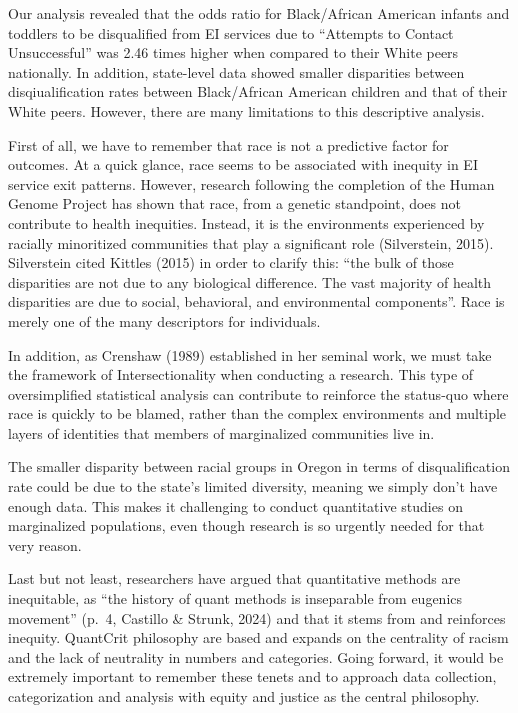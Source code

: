 \documentclass[
  letterpaper,
  DIV=11,
  numbers=noendperiod]{scrartcl}
\begin{document}
Our analysis revealed that the odds ratio for Black/African American
infants and toddlers to be disqualified from EI services due to
``Attempts to Contact Unsuccessful'' was 2.46 times higher when compared
to their White peers nationally. In addition, state-level data showed
smaller disparities between disqiualification rates between
Black/African American children and that of their White peers. However,
there are many limitations to this descriptive analysis.

First of all, we have to remember that race is not a predictive factor
for outcomes. At a quick glance, race seems to be associated with
inequity in EI service exit patterns. However, research following the
completion of the Human Genome Project has shown that race, from a
genetic standpoint, does not contribute to health inequities. Instead,
it is the environments experienced by racially minoritized communities
that play a significant role (Silverstein, 2015). Silverstein cited
Kittles (2015) in order to clarify this: ``the bulk of those disparities
are not due to any biological difference. The vast majority of health
disparities are due to social, behavioral, and environmental
components''. Race is merely one of the many descriptors for
individuals.~

In addition, as Crenshaw (1989) established in her seminal work, we must
take the framework of Intersectionality when conducting a research. This
type of oversimplified statistical analysis can contribute to reinforce
the status-quo where race is quickly to be blamed, rather than the
complex environments and multiple layers of identities that members of
marginalized communities live in.

The smaller disparity between racial groups in Oregon in terms of
disqualification rate could be due to the state's limited diversity,
meaning we simply don't have enough data. This makes it challenging to
conduct quantitative studies on marginalized populations, even though
research is so urgently needed for that very reason.

Last but not least, researchers have argued that quantitative methods
are inequitable, as ``the history of quant methods is inseparable from
eugenics movement'' (p.~4, Castillo \& Strunk, 2024) and that it stems
from and reinforces inequity. QuantCrit philosophy are based and expands
on the centrality of racism and the lack of neutrality in numbers and
categories. Going forward, it would be extremely important to remember
these tenets and to approach data collection, categorization and
analysis with equity and justice as the central philosophy.
\end{document}
